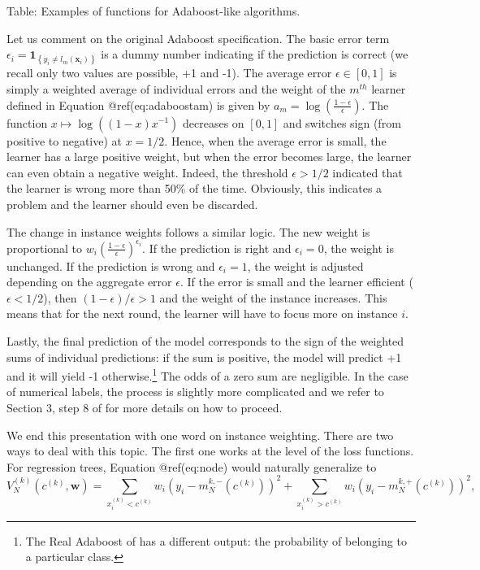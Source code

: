 \bigskip

Table: Examples of functions for Adaboost-like algorithms.

Let us comment on the original Adaboost specification. The basic error term $\epsilon_i=\textbf{1}_{\left\{y_i\neq l_m(\textbf{x}_i) \right\}}$ is a dummy number indicating if the prediction is correct (we recall only two values are possible, +1 and -1). The average error $\epsilon\in [0,1]$ is simply a weighted average of individual errors and the weight of the $m^{th}$ learner defined in Equation @ref(eq:adaboostam) is given by $a_m=\log\left(\frac{1 -\epsilon}{\epsilon} \right)$. The function $x\mapsto \log((1 -x)x^{ -1})$ decreases on $[0,1]$ and switches sign (from positive to negative) at $x=1/2$. Hence, when the average error is small, the learner has a large positive weight, but when the error becomes large, the learner can even obtain a negative weight. Indeed, the threshold $\epsilon>1/2$ indicated that the learner is wrong more than 50\% of the time. Obviously, this indicates a problem and the learner should even be discarded.

The change in instance weights follows a similar logic. The new weight is proportional to $w_i\left(\frac{1 -\epsilon}{\epsilon} \right)^{\epsilon_i}$. If the prediction is right and $\epsilon_i=0$, the weight is unchanged. If the prediction is wrong and $\epsilon_i=1$, the weight is adjusted depending on the aggregate error $\epsilon$. If the error is small and the learner efficient ($\epsilon<1/2$), then $(1 -\epsilon)/\epsilon>1$ and the weight of the instance increases. This means that for the next round, the learner will have to focus more on instance $i$.

Lastly, the final prediction of the model corresponds to the sign of the weighted sums of individual predictions: if the sum is positive, the model will predict +1 and it will yield -1 otherwise.\footnote{The Real Adaboost of \cite{friedman2000additive} has a different output: the probability of belonging to a particular class.} The odds of a zero sum are negligible. In the case of numerical labels, the process is slightly more complicated and we refer to Section 3, step 8 of \cite{drucker1997improving} for more details on how to proceed.

We end this presentation with one word on instance weighting. There are two ways to deal with this topic. The first one works at the level of the loss functions. For regression trees, Equation @ref(eq:node) would naturally generalize to
\begin{equation}
V^{(k)}_N(c^{(k)}, \textbf{w})= \sum_{x_i^{(k)}<c^{(k)}}w_i\left(y_i-m_N^{k,-}(c^{(k)}) \right)^2 + \sum_{x_i^{(k)}>c^{(k)}}w_i\left(y_i-m_N^{k,+}(c^{(k)}) \right)^2,
\end{equation}

